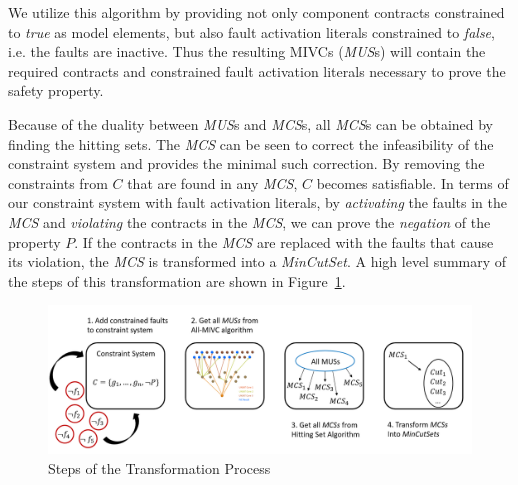 We utilize this algorithm by providing not only component contracts constrained to \textit{true} as model elements, but also fault activation literals constrained to \textit{false}, i.e. the faults are inactive. Thus the resulting MIVCs (\textit{MUS}s) will contain the required contracts and constrained fault activation literals necessary to prove the safety property. 

Because of the duality between \textit{MUS}s and \textit{MCS}s, all \textit{MCS}s can be obtained by finding the hitting sets. The \textit{MCS} can be seen to correct the infeasibility of the constraint system and provides the minimal such correction. By removing the constraints from $C$ that are found in any \textit{MCS}, $C$ becomes satisfiable. In terms of our constraint system with fault activation literals, by \textit{activating} the faults in the \textit{MCS} and \textit{violating} the contracts in the \textit{MCS}, we can prove the \textit{negation} of the property $P$. If the contracts in the \textit{MCS} are replaced with the faults that cause its violation, the \textit{MCS} is transformed into a \textit{MinCutSet}. A high level summary of the steps of this transformation are shown in Figure~\ref{fig:trans}. \\

\begin{figure}[h!]
	\begin{center}
		\includegraphics[width=1.0\textwidth]{images/stepsOfTransformation.PNG}
	\end{center}
	\caption{Steps of the Transformation Process}
	\label{fig:trans}
\end{figure}

